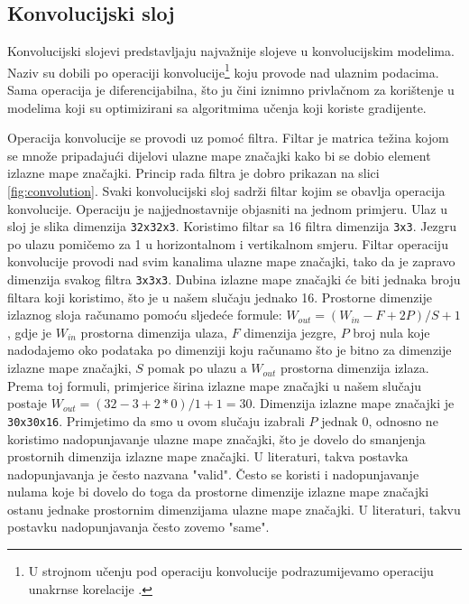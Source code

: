 \documentclass[times, utf8, diplomski,  numeric]{fer}
\begin{document}
\subsection{Konvolucijski sloj}
Konvolucijski slojevi predstavljaju najvažnije slojeve u konvolucijskim modelima. Naziv su dobili po operaciji konvolucije\footnote{U strojnom učenju pod operaciju konvolucije podrazumijevamo operaciju unakrnse korelacije \cite{du-web}.} koju provode nad ulaznim podacima. Sama operacija je diferencijabilna, što ju čini iznimno privlačnom za korištenje u modelima koji su optimizirani sa algoritmima učenja koji koriste gradijente. 
\par
Operacija konvolucije se provodi uz pomoć filtra. Filtar je matrica težina kojom se množe pripadajući dijelovi ulazne mape značajki kako bi se dobio element izlazne mape značajki. Princip rada filtra je dobro prikazan na slici \ref{fig:convolution}. Svaki konvolucijski sloj sadrži filtar kojim se obavlja operacija konvolucije. Operaciju je najjednostavnije objasniti na jednom primjeru. Ulaz u sloj je slika dimenzija \verb|32x32x3|. Koristimo filtar sa 16 filtra dimenzija \verb|3x3|. Jezgru po ulazu pomičemo za 1 u horizontalnom i vertikalnom smjeru. Filtar operaciju konvolucije provodi nad svim kanalima ulazne mape značajki, tako da je zapravo dimenzija svakog filtra \verb|3x3x3|. Dubina izlazne mape značajki će biti jednaka broju filtara koji koristimo, što je u našem slučaju jednako 16. Prostorne dimenzije izlaznog sloja računamo pomoću sljedeće formule: $W_{out} = (W_{in} - F + 2P) / S + 1$, gdje je $W_{in}$ prostorna dimenzija ulaza, $F$ dimenzija jezgre, $P$ broj nula koje nadodajemo oko podataka po dimenziji koju računamo što je bitno za dimenzije izlazne mape značajki, $S$ pomak po ulazu a $W_{out}$ prostorna dimenzija izlaza. Prema toj formuli, primjerice širina izlazne mape značajki u našem slučaju postaje $W_{out} = (32 - 3 + 2*0) / 1 + 1 = 30$. Dimenzija izlazne mape značajki je \verb|30x30x16|. Primjetimo da smo u ovom slučaju izabrali $P$ jednak 0, odnosno ne koristimo nadopunjavanje ulazne mape značajki, što je dovelo do smanjenja prostornih dimenzija izlazne mape značajki. U literaturi, takva postavka nadopunjavanja je često nazvana "valid". Često se koristi i nadopunjavanje nulama koje bi dovelo do toga da prostorne dimenzije izlazne mape značajki ostanu jednake prostornim dimenzijama ulazne mape značajki. U literaturi, takvu postavku nadopunjavanja često zovemo "same".  
\end{document}
